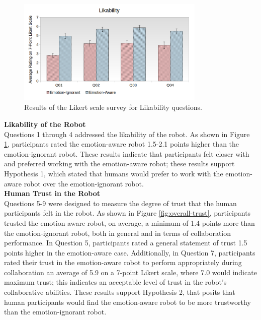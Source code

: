 \documentclass[12pt]{report}
\begin{document}
\begin{figure}[ht]
 \centering
 \includegraphics[width=0.8\textwidth]{figure/Overall-Likability.png}
 \vspace*{-5mm}
 \caption{Results of the Likert scale survey for Likability questions.}
 \label{fig:overall-likability}
\end{figure}

\hspace*{-8mm} \textbf{Likability of the Robot}
\label{sec:Likability}
\\Questions 1 through 4 addressed the likability of the robot. As shown in
Figure \ref{fig:overall-likability}, participants rated the emotion-aware robot
1.5-2.1 points higher than the emotion-ignorant robot. These results
indicate that participants felt closer with and preferred working with the
emotion-aware robot; these results support Hypothesis 1, which stated that
humans would prefer to work with the emotion-aware robot over the
emotion-ignorant robot. \\

\hspace*{-8mm} \textbf{Human Trust in the Robot}
\label{sec:Trust}
\\ Questions 5-9 were designed to measure the degree of trust that the human
participants felt in the robot. As shown in Figure \ref{fig:overall-trust},
participants trusted the emotion-aware robot, on average, a minimum of 1.4
points more than the emotion-ignorant robot, both in general and in terms of
collaboration performance. In Question 5, participants rated a
general statement of trust 1.5 points higher in the emotion-aware
case. Additionally, in Question 7, participants rated their trust in the
emotion-aware robot to perform appropriately during collaboration an average of
5.9 on a 7-point Likert scale, where 7.0 would indicate maximum trust; this
indicates an acceptable level of trust in the robot's collaborative
abilities. These results support Hypothesis 2, that posits that human
participants would find the emotion-aware robot to be more trustworthy than the
emotion-ignorant robot.\\
\end{document}
